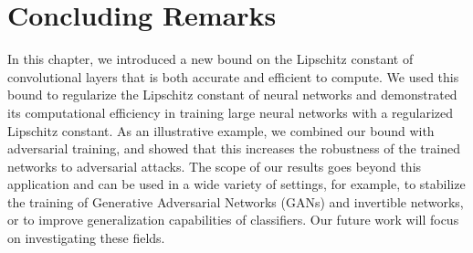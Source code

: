 \section{Concluding Remarks}
\label{section:ch5-concluding_remarks}

In this chapter, we introduced a new bound on the Lipschitz constant of convolutional layers that is both accurate and efficient to compute.
We used this bound to regularize the Lipschitz constant of neural networks and demonstrated its computational efficiency in training large neural networks with a regularized Lipschitz constant.
As an illustrative example, we combined our bound with adversarial training, and showed that this increases the robustness of the trained networks to  adversarial attacks.
The scope of our results goes beyond this application and can be used in a wide variety of settings, for example, to stabilize the training of Generative Adversarial Networks (GANs) and invertible networks, or to improve generalization capabilities of classifiers.
Our future work will focus on investigating these fields.

